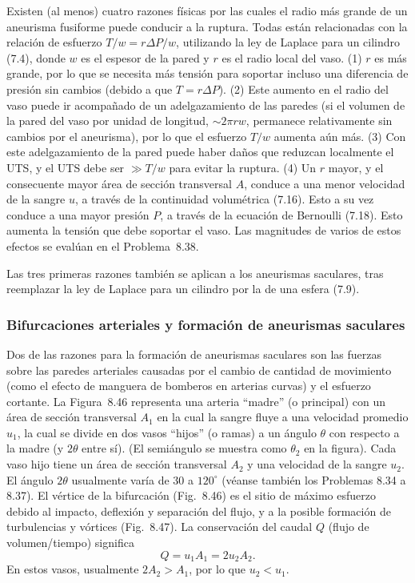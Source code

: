 \documentclass[12pt]{book}
\begin{document}
Existen (al menos) cuatro razones físicas por las cuales el radio más grande de un aneurisma fusiforme puede conducir a la ruptura. Todas están relacionadas con la relación de esfuerzo $T/w = r\Delta P / w$, utilizando la ley de Laplace para un cilindro (7.4), donde $w$ es el espesor de la pared y $r$ es el radio local del vaso. (1) $r$ es más grande, por lo que se necesita más tensión para soportar incluso una diferencia de presión sin cambios (debido a que $T = r\Delta P$). (2) Este aumento en el radio del vaso puede ir acompañado de un adelgazamiento de las paredes (si el volumen de la pared del vaso por unidad de longitud, ${\sim}2\pi r w$, permanece relativamente sin cambios por el aneurisma), por lo que el esfuerzo $T/w$ aumenta aún más. (3) Con este adelgazamiento de la pared puede haber daños que reduzcan localmente el UTS, y el UTS debe ser $\gg T/w$ para evitar la ruptura. (4) Un $r$ mayor, y el consecuente mayor área de sección transversal $A$, conduce a una menor velocidad de la sangre $u$, a través de la continuidad volumétrica (7.16). Esto a su vez conduce a una mayor presión $P$, a través de la ecuación de Bernoulli (7.18). Esto aumenta la tensión que debe soportar el vaso. Las magnitudes de varios de estos efectos se evalúan en el Problema~8.38.

Las tres primeras razones también se aplican a los aneurismas saculares, tras reemplazar la ley de Laplace para un cilindro por la de una esfera (7.9).

\subsubsection*{Bifurcaciones arteriales y formación de aneurismas saculares}

Dos de las razones para la formación de aneurismas saculares son las fuerzas sobre las paredes arteriales causadas por el cambio de cantidad de movimiento (como el efecto de manguera de bomberos en arterias curvas) y el esfuerzo cortante. La Figura~8.46 representa una arteria ``madre'' (o principal) con un área de sección transversal $A_1$ en la cual la sangre fluye a una velocidad promedio $u_1$, la cual se divide en dos vasos ``hijos'' (o ramas) a un ángulo $\theta$ con respecto a la madre (y $2\theta$ entre sí). (El semiángulo se muestra como $\theta_2$ en la figura). Cada vaso hijo tiene un área de sección transversal $A_2$ y una velocidad de la sangre $u_2$. El ángulo $2\theta$ usualmente varía de $30$ a $120^\circ$ (véanse también los Problemas 8.34 a 8.37). El vértice de la bifurcación (Fig.~8.46) es el sitio de máximo esfuerzo debido al impacto, deflexión y separación del flujo, y a la posible formación de turbulencias y vórtices (Fig.~8.47). La conservación del caudal $Q$ (flujo de volumen/tiempo) significa
\begin{equation}
Q = u_1 A_1 = 2 u_2 A_2.
\label{eq:836}
\end{equation}
En estos vasos, usualmente $2 A_2 > A_1$, por lo que $u_2 < u_1$.
\end{document}
